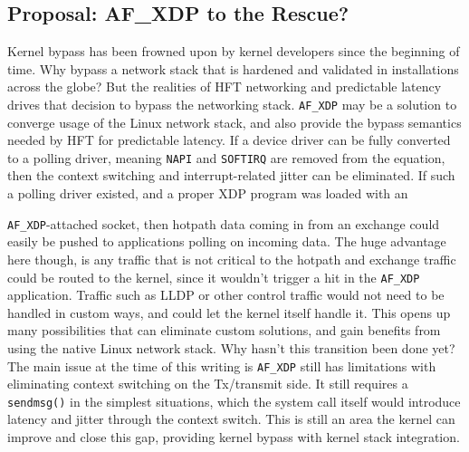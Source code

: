 \documentclass[letterpaper]{article}
\begin{document}
{{\subsection{Proposal: AF\_XDP to the Rescue?}
Kernel bypass has been frowned upon by kernel developers since the beginning of time. Why bypass a network stack that is hardened and validated in installations across the globe?  But the realities of HFT networking and predictable latency drives that decision to bypass the networking stack.
\newline
\newline
{\small \texttt{AF\_XDP}} \cite{afxdp} may be a solution to converge usage of the Linux network stack, and also provide the bypass semantics needed by HFT for predictable latency. If a device driver can be fully converted to a polling driver, meaning {\small \texttt{NAPI}} and {\small \texttt{SOFTIRQ}} are removed from the equation, then the context switching and interrupt-related jitter can be eliminated.
\newline
\newline
If such a polling driver existed, and a proper XDP program was loaded with an {\small \texttt{AF\_XDP}-attached socket, then hotpath data coming in from an exchange could easily be pushed to applications polling on incoming data. The huge advantage here though, is any traffic that is not critical to the hotpath and exchange traffic could be routed to the kernel, since it wouldn't trigger a hit in the {\small \texttt{AF\_XDP}} application. Traffic such as LLDP or other control traffic would not need to be handled in custom ways, and could let the kernel itself handle it. This opens up many possibilities that can eliminate custom solutions, and gain benefits from using the native Linux network stack.
\newline
\newline
Why hasn't this transition been done yet? The main issue at the time of this writing is {\small \texttt{AF\_XDP}} still has limitations with eliminating context switching on the Tx/transmit side. It still requires a {\small \texttt{sendmsg()}} in the simplest situations, which the system call itself would introduce latency and jitter through the context switch.  This is still an area the kernel can improve and close this gap, providing kernel bypass with kernel stack integration.

}}}
\end{document}
